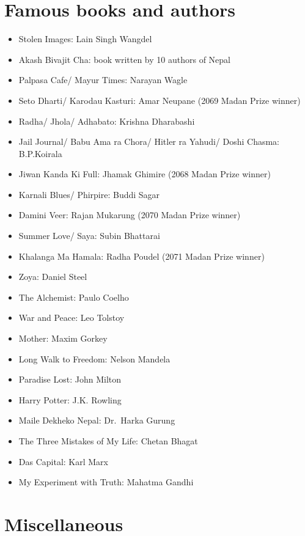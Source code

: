 \documentclass[
  openany]{book}
\providecommand{\tightlist}{%
  \setlength{\itemsep}{0pt}\setlength{\parskip}{0pt}}
\begin{document}
\hypertarget{famous-books-and-authors}{%
\section{Famous books and authors}\label{famous-books-and-authors}}

\begin{itemize}
\tightlist
\item
  Stolen Images: Lain Singh Wangdel
\item
  Akash Bivajit Cha: book written by 10 authors of Nepal
\item
  Palpasa Cafe/ Mayur Times: Narayan Wagle
\item
  Seto Dharti/ Karodau Kasturi: Amar Neupane (2069 Madan Prize winner)
\item
  Radha/ Jhola/ Adhabato: Krishna Dharabashi
\item
  Jail Journal/ Babu Ama ra Chora/ Hitler ra Yahudi/ Doshi Chasma: B.P.Koirala
\item
  Jiwan Kanda Ki Full: Jhamak Ghimire (2068 Madan Prize winner)
\item
  Karnali Blues/ Phirpire: Buddi Sagar
\item
  Damini Veer: Rajan Mukarung (2070 Madan Prize winner)
\item
  Summer Love/ Saya: Subin Bhattarai
\item
  Khalanga Ma Hamala: Radha Poudel (2071 Madan Prize winner)
\item
  Zoya: Daniel Steel
\item
  The Alchemist: Paulo Coelho
\item
  War and Peace: Leo Tolstoy
\item
  Mother: Maxim Gorkey
\item
  Long Walk to Freedom: Nelson Mandela
\item
  Paradise Lost: John Milton
\item
  Harry Potter: J.K. Rowling
\item
  Maile Dekheko Nepal: Dr.~Harka Gurung
\item
  The Three Mistakes of My Life: Chetan Bhagat
\item
  Das Capital: Karl Marx
\item
  My Experiment with Truth: Mahatma Gandhi
\end{itemize}

\hypertarget{miscellaneous-2}{%
\section{Miscellaneous}\label{miscellaneous-2}}
\end{document}
